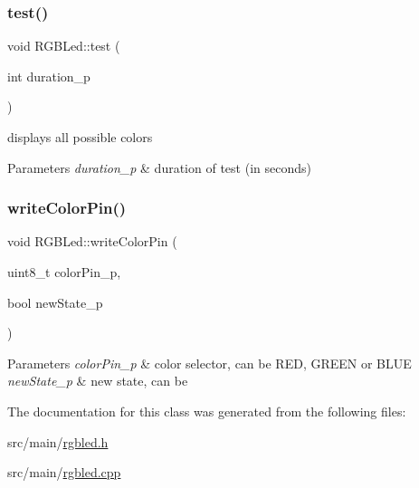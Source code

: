 \subsubsection{\texorpdfstring{test()}{test()}}
{\footnotesize\ttfamily void R\+G\+B\+Led\+::test (\begin{DoxyParamCaption}\item[{int}]{duration\+\_\+p }\end{DoxyParamCaption})}



displays all possible colors 


\begin{DoxyParams}{Parameters}
{\em duration\+\_\+p} & duration of test (in seconds) \\
\hline
\end{DoxyParams}
\mbox{\label{class_r_g_b_led_a9ab9701eb0f4d945fd9ca6e2235d7ee9}} 
\subsubsection{\texorpdfstring{write\+Color\+Pin()}{writeColorPin()}}
{\footnotesize\ttfamily void R\+G\+B\+Led\+::write\+Color\+Pin (\begin{DoxyParamCaption}\item[{uint8\+\_\+t}]{color\+Pin\+\_\+p,  }\item[{bool}]{new\+State\+\_\+p }\end{DoxyParamCaption})}


\begin{DoxyParams}{Parameters}
{\em color\+Pin\+\_\+p} & color selector, can be R\+ED, G\+R\+E\+EN or B\+L\+UE \\
\hline
{\em new\+State\+\_\+p} & new state, can be \\
\hline
\end{DoxyParams}


The documentation for this class was generated from the following files\+:\begin{DoxyCompactItemize}
\item 
src/main/\hyperlink{rgbled_8h}{rgbled.\+h}\item 
src/main/\hyperlink{rgbled_8cpp}{rgbled.\+cpp}\end{DoxyCompactItemize}
